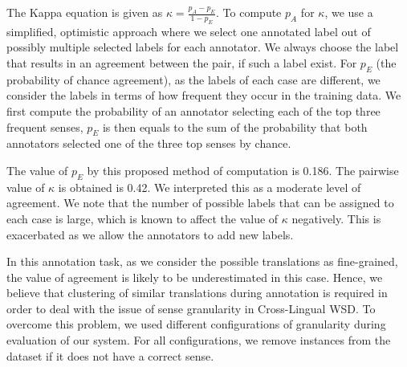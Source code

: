 {The Kappa equation is given as 
$\kappa = \frac{p_A - p_E}{1 - p_E} $.
To compute $p_A$ for $\kappa$, we use a simplified, optimistic approach where we select one annotated label out of possibly multiple selected labels for each annotator. We always choose the label that results in an agreement between the pair, if such a label exist. For $p_E$ (the probability of chance agreement), as the labels of each case are different, we consider the labels in terms of how frequent they occur in the training data. 
We first compute the probability of an annotator selecting each of the top three frequent senses, $p_E$ is then equals to the sum of the probability that both annotators selected one of the three top senses by chance. 

The value of $p_E$ by this proposed method of computation is 0.186. The pairwise value of $\kappa$ is obtained is 0.42. We interpreted this as a moderate level of agreement. We note that the number of possible labels that can be assigned to each case is large, which is known to affect the value of $\kappa$ negatively. This is exacerbated as we allow the annotators to add new labels. 


In this annotation task, as we consider the possible translations as  fine-grained, the value of agreement is likely to be underestimated in this case. Hence, we believe that clustering of similar translations during annotation is required in order to deal with the issue of sense granularity in Cross-Lingual WSD. 
To overcome this problem, we used different configurations of granularity during evaluation of our system. 
For all configurations,
we remove instances from the dataset if it does not have a correct sense. 

}
